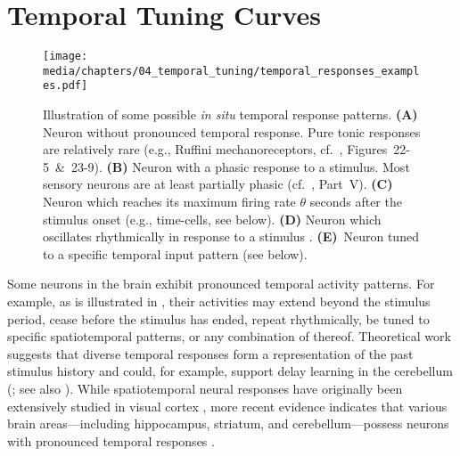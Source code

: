 
\section{Temporal Tuning Curves}
\label{sec:temporal_tuning_curves}

\begin{figure}
	\centering
	\texttt{[image: media/chapters/04\_temporal\_tuning/temporal\_responses\_examples.pdf]}%
	{\label{fig:temporal_responses_examples_a}}%
	{\label{fig:temporal_responses_examples_b}}%
	{\label{fig:temporal_responses_examples_c}}%
	{\label{fig:temporal_responses_examples_d}}%
	{\label{fig:temporal_responses_examples_e}}%
	\caption[Illustration of some possible \emph{in situ} temporal response patterns]{Illustration of some possible \emph{in situ} temporal response patterns.
	\textbf{(A)} Neuron without pronounced temporal response.
	Pure tonic responses are relatively rare (e.g., Ruffini mechanoreceptors, cf.~\cite{kandel2012principles}, Figures~22-5~\&~23-9).
	\textbf{(B)} Neuron with a phasic response to a stimulus. Most sensory neurons are at least partially phasic (cf.~\cite{kandel2012principles}, Part~V).
	\textbf{(C)} Neuron which reaches its maximum firing rate $\theta$ seconds after the stimulus onset (e.g., time-cells, see below).
	\textbf{(D)} Neuron which oscillates rhythmically in response to a stimulus \citep[e.g.,][]{friedman-hill2000dynamics}.
	\textbf{(E)}~Neuron tuned to a specific temporal input pattern (see below).
	}
	\label{fig:temporal_responses_examples}
\end{figure}

Some neurons in the brain exhibit pronounced temporal activity patterns.
For example, as is illustrated in , their activities may extend beyond the stimulus period, cease before the stimulus has ended, repeat rhythmically, be tuned to specific spatiotemporal patterns, or any combination of thereof.
Theoretical work suggests that diverse temporal responses form a representation of the past stimulus history \citep{grossberg1989neural,howard2014unified,voelker2018improving} and could, for example, support delay learning in the cerebellum (\cite{fujita1982adaptive,medina2000computer}; see also ).
While spatiotemporal neural responses have originally been extensively studied in visual cortex \citep[e.g.,][]{deangelis1993spatiotemporal,carandini1999linearity}, more recent evidence indicates that various brain areas---including hippocampus, striatum, and cerebellum---possess neurons with pronounced temporal responses \citep[e.g.,][]{lusk2016cerebellar}.

